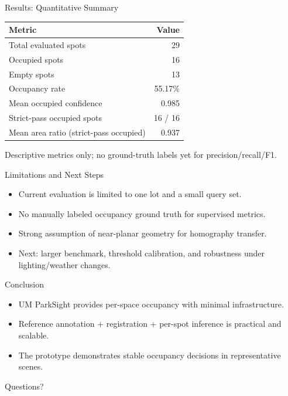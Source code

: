 \documentclass[aspectratio=169]{beamer}
\begin{document}
\begin{frame}{Results: Quantitative Summary}
\centering
\begin{tabular}{lr}
\toprule
Metric & Value \\
\midrule
Total evaluated spots & 29 \\
Occupied spots & 16 \\
Empty spots & 13 \\
Occupancy rate & 55.17\% \\
Mean occupied confidence & 0.985 \\
Strict-pass occupied spots & 16 / 16 \\
Mean area ratio (strict-pass occupied) & 0.937 \\
\bottomrule
\end{tabular}
\vspace{0.04\textheight}

Descriptive metrics only; no ground-truth labels yet for precision/recall/F1.
\end{frame}

\begin{frame}{Limitations and Next Steps}
\begin{itemize}
    \item Current evaluation is limited to one lot and a small query set.
    \item No manually labeled occupancy ground truth for supervised metrics.
    \item Strong assumption of near-planar geometry for homography transfer.
    \item Next: larger benchmark, threshold calibration, and robustness under lighting/weather changes.
\end{itemize}
\end{frame}

\begin{frame}{Conclusion}
\begin{itemize}
    \item UM ParkSight provides per-space occupancy with minimal infrastructure.
    \item Reference annotation + registration + per-spot inference is practical and scalable.
    \item The prototype demonstrates stable occupancy decisions in representative scenes.
\end{itemize}

\vfill
\centering
\Large Questions?
\end{frame}
\end{document}
